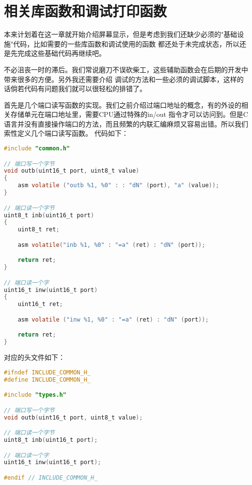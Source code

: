 
\section {相关库函数和调试打印函数}

\par 本来计划着在这一章就开始介绍屏幕显示，但是考虑到我们还缺少必须的"基础设施"代码，比如需要的一些库函数和调试使用的函数\allowbreak
都还处于未完成状态，所以还是先完成这些基础代码再继续吧。

\par 不必沮丧一时的滞后。我们常说磨刀不误砍柴工，这些辅助函数会在后期的开发中带来很多的方便。另外我还需要介绍\allowbreak
调试的方法和一些必须的调试脚本，这样的话倘若代码有问题我们就可以很轻松的排错了。

\par 首先是几个端口读写函数的实现。我们之前介绍过端口地址的概念，有的外设的相关存储单元在端口地址里，需要CPU通过特殊的in/out\allowbreak
指令才可以访问到。但是C语言并没有直接操作端口的方法，而且频繁的内联汇编麻烦又容易出错。所以我们索性定义几个端口读写函数。\allowbreak
代码如下：

\begin{lstlisting}[language = C, label = libs/common.c, caption = libs/common.c]
#include "common.h"

// 端口写一个字节
void outb(uint16_t port, uint8_t value)
{
	asm volatile ("outb %1, %0" : : "dN" (port), "a" (value));
}

// 端口读一个字节
uint8_t inb(uint16_t port)
{
	uint8_t ret;

	asm volatile("inb %1, %0" : "=a" (ret) : "dN" (port));

	return ret;
}

// 端口读一个字
uint16_t inw(uint16_t port)
{
	uint16_t ret;

	asm volatile ("inw %1, %0" : "=a" (ret) : "dN" (port));

	return ret;
}
\end{lstlisting}

\par 对应的头文件如下：
\begin{lstlisting}[language = C, label = include/common.h, caption = include/common.h]
#ifndef INCLUDE_COMMON_H_
#define INCLUDE_COMMON_H_

#include "types.h"

// 端口写一个字节
void outb(uint16_t port, uint8_t value);

// 端口读一个字节
uint8_t inb(uint16_t port);

// 端口读一个字
uint16_t inw(uint16_t port);

#endif // INCLUDE_COMMON_H_
\end{lstlisting}



